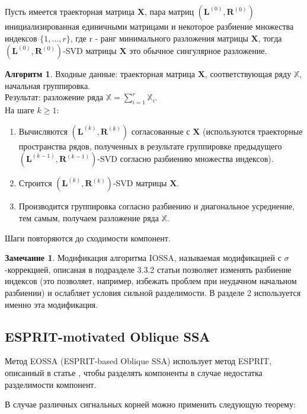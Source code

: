 \documentclass[specialist, substylefile = spbureport.rtx, subf,href,colorlinks=true, 12pt]{disser}
\theoremstyle{definition}
\newtheorem{algorithm}{Алгоритм}
\newtheorem{remark}{Замечание}
\begin{document}
    Пусть имеется траекторная матрица $\mathbf{X}$, пара матриц $(\mathbf{L}^{(0)}, \mathbf{R}^{(0)})$ инициализированная единичными матрицами и некоторое разбиение множества индексов $\{ 1,...,r\}$, где r - ранг минимального разложения матрицы $\mathbf{X}$, тогда $(\mathbf{L}^{(0)}, \mathbf{R}^{(0)})$-SVD матрицы $\mathbf{X}$ это обычное сингулярное разложение.
    \begin{algorithm}
    Входные данные: траекторная матрица $\mathbf{X}$, соответствующая ряду $\mathbb{X}$, начальная группировка.
    \\ Результат: разложение ряда $\mathbb{X} = \sum_{i = 1}^{r}\mathbb{X}_i$.\\
        На шаге $k \geq 1$:
        \begin{enumerate}
            \item Вычисляются $(\mathbf{L}^{(k)}, \mathbf{R}^{(k)})$ согласованные с $\mathbf{X}$ (используются траекторные пространства рядов, полученных в результате группировке предыдущего $(\mathbf{L}^{(k - 1)}, \mathbf{R}^{(k - 1)})$-SVD согласно разбиению множества индексов).
            \item Строится $(\mathbf{L}^{(k)}, \mathbf{R}^{(k)})$-SVD матрицы $\mathbf{X}$.
            \item Производится группировка согласно разбиению и диагональное усреднение, тем самым, получаем разложение ряда $\mathbb{X}$.
        \end{enumerate}
        Шаги повторяются до сходимости компонент.
    \end{algorithm}
    \begin{remark}
        Модификация алгоритма IOSSA, называемая модификацией с $\sigma$-коррекцией, описаная в подразделе 3.3.2 статьи \cite{Golyandina15} позволяет изменять разбиение индексов (это позволяет, например, избежать проблем при неудачном начальном разбиении) и ослабляет условия сильной разделимости. В разделе 2 используется именно эта модификация.
    \end{remark}
    
    \subsection{ESPRIT-motivated Oblique SSA}

Метод EOSSA (ESPRIT-based Oblique SSA) использует метод ESPRIT, описанный в статье \cite{Roy89}, чтобы разделять компоненты в случае недостатка разделимости компонент.

В случае различных сигнальных корней можно применить следующую теорему:
\end{document}
